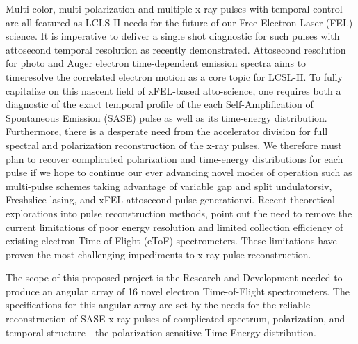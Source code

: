 Multi-color, multi-polarization and multiple x-ray pulses with temporal control are all featured as LCLS-II needs for the future of our Free-Electron Laser (FEL) science. 
It is imperative to deliver a single shot diagnostic for such pulses with attosecond temporal resolution as recently demonstrated.
Attosecond resolution for photo and Auger electron time-dependent emission spectra aims to timeresolve the correlated electron motion as a core topic for LCSL-II. 
To fully capitalize on this nascent field of xFEL-based atto-science, one requires both a diagnostic of the exact temporal profile of the each Self-Amplification of Spontaneous Emission (SASE) pulse as well as its time-energy distribution.
Furthermore, there is a desperate need from the accelerator division for full spectral and polarization reconstruction of the x-ray pulses. 
We therefore must plan to recover complicated polarization and time-energy distributions for each pulse if we hope to continue our ever advancing novel modes of operation such as multi-pulse schemes taking advantage of variable gap and split undulatorsiv, Freshslice lasing, and xFEL attosecond pulse generationvi. Recent theoretical explorations into pulse reconstruction methods, point out the need to remove the current limitations of poor energy resolution and limited collection efficiency of existing electron Time-of-Flight (eToF) spectrometers.
These limitations have proven the most challenging impediments to x-ray pulse reconstruction.

The scope of this proposed project is the Research and Development needed to produce an angular array of 16 novel electron Time-of-Flight spectrometers. 
The specifications for this angular array are set by the needs for the reliable reconstruction of SASE x-ray pulses of complicated spectrum, polarization, and temporal structure—the polarization sensitive Time-Energy distribution.
